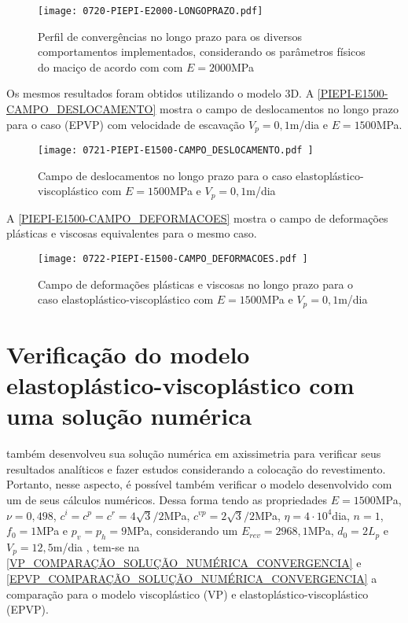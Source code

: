 \begin{figure}[H]
	\begin{center}
		\texttt{[image: 0720-PIEPI-E2000-LONGOPRAZO.pdf]}
	\end{center}
	\caption{\label{PIEPI-E2000-LONGOPRAZO}Perfil de convergências no longo prazo para os diversos comportamentos implementados, considerando os parâmetros físicos do maciço de acordo com  com $E=2000$MPa}
\end{figure}

Os mesmos resultados foram obtidos utilizando o modelo 3D. A \autoref{PIEPI-E1500-CAMPO_DESLOCAMENTO} mostra o campo de deslocamentos no longo prazo para o caso (EPVP) com velocidade de escavação $V_p=0,1$m/dia e $E=1500$MPa.

\begin{figure}[H]
	\begin{center}
		\texttt{[image: 0721-PIEPI-E1500-CAMPO\_DESLOCAMENTO.pdf
		]}
	\end{center}
	\caption{\label{PIEPI-E1500-CAMPO_DESLOCAMENTO}Campo de deslocamentos no longo prazo para o caso elastoplástico-viscoplástico com $E=1500$MPa e $V_p=0,1$m/dia}
\end{figure}

A \autoref{PIEPI-E1500-CAMPO_DEFORMACOES} mostra o campo de deformações plásticas e viscosas equivalentes para o mesmo caso.

\begin{figure}[H]
	\begin{center}
		\texttt{[image: 0722-PIEPI-E1500-CAMPO\_DEFORMACOES.pdf
		]}
	\end{center}
	\caption{\label{PIEPI-E1500-CAMPO_DEFORMACOES}Campo de deformações plásticas e viscosas no longo prazo para o caso elastoplástico-viscoplástico com $E=1500$MPa e $V_p=0,1$m/dia}
\end{figure}

\section{Verificação do modelo elastoplástico-viscoplástico com uma solução numérica}

 também desenvolveu sua solução numérica em axissimetria para verificar seus resultados analíticos e fazer estudos considerando a colocação do revestimento. Portanto, nesse aspecto, é possível também verificar o modelo desenvolvido com um de seus cálculos numéricos. Dessa forma tendo as propriedades $E=1500$MPa, $\nu=0,498$, $c^i=c^p=c^r =4\sqrt{3}/2$MPa, $c^{vp}=2\sqrt{3}/2$MPa, $\eta = 4 \cdot 10^4$dia, $n=1$, $f_0=1$MPa e $p_v=p_h=9$MPa, considerando um $E_{rev} = 2968,1$MPa, $d_0 = 2L_p$ e $V_p=12,5$m/dia \cite[p. 128, 132]{Piepi1995}, tem-se na \autoref{VP_COMPARAÇÃO_SOLUÇÃO_NUMÉRICA_CONVERGENCIA} e \autoref{EPVP_COMPARAÇÃO_SOLUÇÃO_NUMÉRICA_CONVERGENCIA} a comparação para o modelo viscoplástico (VP) e elastoplástico-viscoplástico (EPVP).

